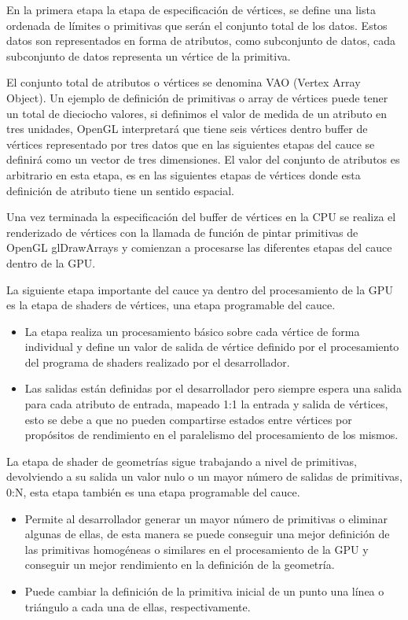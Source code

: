 \documentclass[a4paper, 17pt]{book}
\begin{document}
En la primera etapa la etapa de especificación de vértices, se define una lista ordenada de límites o primitivas que serán el conjunto
total de los datos. Estos datos son representados en forma de atributos, como subconjunto de datos, cada subconjunto de datos
representa un vértice de la primitiva.

El conjunto total de atributos o vértices se denomina VAO (Vertex Array Object). Un ejemplo de definición de primitivas o array de
vértices puede tener un total de dieciocho valores, si definimos el valor de medida de un atributo en tres unidades, OpenGL
interpretará que tiene seis vértices dentro buffer de vértices representado por tres datos que en las siguientes etapas del
cauce se definirá como un vector de tres dimensiones. El valor del conjunto de atributos es arbitrario en esta etapa, es en las
siguientes etapas de vértices donde esta definición de atributo tiene un sentido espacial.

Una vez terminada la especificación del buffer de vértices en la CPU se realiza el renderizado de vértices con la llamada de
función de pintar primitivas de OpenGL glDrawArrays y comienzan a procesarse las diferentes etapas del cauce dentro de la GPU.

La siguiente etapa importante del cauce ya dentro del procesamiento de la GPU es la etapa de shaders de vértices, una etapa
programable del cauce. 

\begin{itemize}
  \item La etapa realiza un procesamiento básico sobre cada vértice de forma individual y define un valor de salida de vértice
  definido por el procesamiento del programa de shaders realizado por el desarrollador. 
  
  \item Las salidas están definidas por el desarrollador pero siempre espera una salida para cada atributo de entrada, mapeado 1:1
  la entrada y salida de vértices, esto se debe a que no pueden compartirse estados entre vértices por propósitos de rendimiento
  en el paralelismo del procesamiento de los mismos.
\end{itemize}

La etapa de shader de geometrías sigue trabajando a nivel de primitivas, devolviendo a su salida un valor nulo o un mayor número de
salidas de primitivas, 0:N, esta etapa también es una etapa programable del cauce.

\begin{itemize}
  \item Permite al desarrollador generar un mayor número de primitivas o eliminar algunas de ellas, de esta manera se puede conseguir
  una mejor definición de las primitivas homogéneas o similares en el procesamiento de la GPU y conseguir un mejor rendimiento en la
  definición de la geometría.
  
  \item Puede cambiar la definición de la primitiva inicial de un punto una línea o triángulo a cada una de ellas, respectivamente.
\end{itemize}
\end{document}
